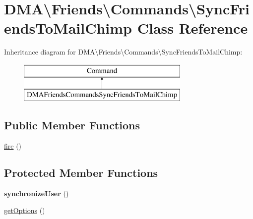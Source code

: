 \hypertarget{classDMA_1_1Friends_1_1Commands_1_1SyncFriendsToMailChimp}{}\section{D\+M\+A\textbackslash{}Friends\textbackslash{}Commands\textbackslash{}Sync\+Friends\+To\+Mail\+Chimp Class Reference}
\label{classDMA_1_1Friends_1_1Commands_1_1SyncFriendsToMailChimp}
Inheritance diagram for D\+M\+A\textbackslash{}Friends\textbackslash{}Commands\textbackslash{}Sync\+Friends\+To\+Mail\+Chimp\+:\begin{figure}[H]
\begin{center}
\leavevmode
\includegraphics[height=2.000000cm]{de/d27/classDMA_1_1Friends_1_1Commands_1_1SyncFriendsToMailChimp}
\end{center}
\end{figure}
\subsection*{Public Member Functions}
\begin{DoxyCompactItemize}
\item 
\hyperlink{classDMA_1_1Friends_1_1Commands_1_1SyncFriendsToMailChimp_ac0630eddb584c741c903bf026dd77806}{fire} ()
\end{DoxyCompactItemize}
\subsection*{Protected Member Functions}
\begin{DoxyCompactItemize}
\item 
\hypertarget{classDMA_1_1Friends_1_1Commands_1_1SyncFriendsToMailChimp_a46021d59cad8b43c71fe99c6733a823d}{}{\bfseries synchronize\+User} ()\label{classDMA_1_1Friends_1_1Commands_1_1SyncFriendsToMailChimp_a46021d59cad8b43c71fe99c6733a823d}

\item 
\hyperlink{classDMA_1_1Friends_1_1Commands_1_1SyncFriendsToMailChimp_aa60597552570eef1a6c8549e9af86773}{get\+Options} ()
\end{DoxyCompactItemize}
